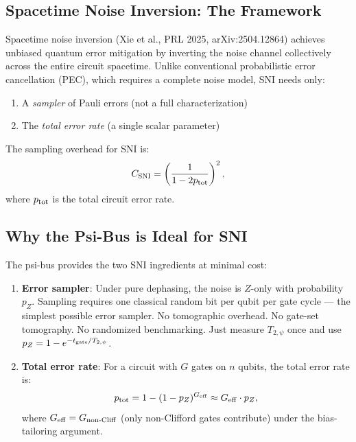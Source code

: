 \documentclass[11pt]{article}
\theoremstyle{definition}
\theoremstyle{remark}
\begin{document}
\subsection{Spacetime Noise Inversion: The Framework}
\label{sec:sni-framework}

Spacetime noise inversion (Xie et al., PRL 2025, arXiv:2504.12864)
achieves unbiased quantum error mitigation by inverting the noise channel
collectively across the entire circuit spacetime.  Unlike conventional
probabilistic error cancellation (PEC), which requires a complete noise
model, SNI needs only:
\begin{enumerate}[nosep]
  \item A \emph{sampler} of Pauli errors (not a full characterization)
  \item The \emph{total error rate} (a single scalar parameter)
\end{enumerate}

The sampling overhead for SNI is:
\begin{equation}
  C_{\rm SNI} = \left(\frac{1}{1 - 2p_{\rm tot}}\right)^2,
  \label{eq:sni-overhead}
\end{equation}
where $p_{\rm tot}$ is the total circuit error rate.

\subsection{Why the Psi-Bus is Ideal for SNI}
\label{sec:psi-sni-ideal}

The psi-bus provides the two SNI ingredients at minimal cost:

\begin{enumerate}
  \item \textbf{Error sampler}: Under pure dephasing, the noise is
    $Z$-only with probability $p_Z$.  Sampling requires one classical
    random bit per qubit per gate cycle --- the simplest possible error
    sampler.  No tomographic overhead.  No gate-set tomography.  No
    randomized benchmarking.  Just measure $T_{2,\psi}$ once and use
    $p_Z = 1 - e^{-t_{\rm gate}/T_{2,\psi}}$.

  \item \textbf{Total error rate}: For a circuit with $G$ gates on
    $n$ qubits, the total error rate is:
    \begin{equation}
      p_{\rm tot} = 1 - (1 - p_Z)^{G_{\rm eff}}
      \approx G_{\rm eff} \cdot p_Z,
      \label{eq:p-tot-psi}
    \end{equation}
    where $G_{\rm eff} = G_{\rm non\text{-}Cliff}$ (only non-Clifford
    gates contribute) under the bias-tailoring argument.
\end{enumerate}
\end{document}
